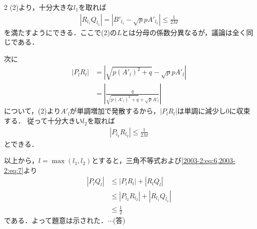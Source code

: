 \documentclass[../../../../main.tex]{subfiles}
\begin{document}
\begin{multicols}{2}
  (2)より，十分大きな$l_1$を取れば
  \begin{align}
    |R_{l_1}Q_{l_1}| = |B'_{l_1}-\sqrt{p} p A'_{l_1}| \le \frac{1}{2M} \label{2003-2:eq:6}
  \end{align}
  を満たすようにできる．ここで(2)の$L$とは分母の係数分異なるが，議論は全く同じである．

  次に
  \begin{align*}
    |P_{l}R_{l}|
     & = |\sqrt{p \left(A'_{l}\right)^{2}+q}-\sqrt{p} p A'_{l}|           \\
     & = |\frac{q}{\sqrt{p \left(A'_{l}\right)^{2}+q} + \sqrt{p} A'_{l}}|
  \end{align*}
  について，(2)より$A'_{l}$が単調増加で発散するから，$|P_{l}R_{l}|$は単調に減少し$0$に収束する．
  従って十分大きい$l_2$を取れば
  \begin{align*}
    |P_{l_2}R_{l_2}| \le \frac{1}{2M} \label{2003-2:eq:7}
  \end{align*}
  とできる．

  以上から，$l=\max(l_1,l_2)$とすると，三角不等式および\cref{2003-2:eq:6,2003-2:eq:7}より
  \begin{align*}
    |P_{l}Q_{l}|
     & \le |P_{l}R_{l}| + |R_{l}Q_{l}|         \\
     & \le |P_{l_2}R_{l_2}| + |R_{l_1}Q_{l_1}| \\
     & \le \frac{1}{2}
  \end{align*}
  である．よって題意は示された．$\cdots$(答)


\end{multicols}
\end{document}
